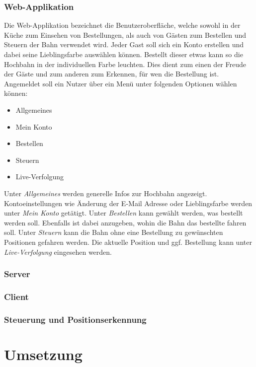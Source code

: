 \subsection{Web-Applikation}
Die Web-Applikation bezeichnet die Benutzeroberfläche, welche sowohl in der Küche zum Einsehen von Bestellungen, als auch von Gästen zum Bestellen und Steuern der Bahn verwendet wird. Jeder Gast soll sich ein Konto erstellen und dabei seine Lieblingsfarbe auswählen können.
Bestellt dieser etwas kann so die Hochbahn in der individuellen Farbe leuchten. Dies dient zum einen der Freude der Gäste und zum anderen zum Erkennen, für wen die Bestellung ist. Angemeldet soll ein Nutzer über ein Menü unter folgenden Optionen
wählen können:
\begin{itemize}
	\item Allgemeines
	\item Mein Konto
	\item Bestellen
	\item Steuern
	\item Live-Verfolgung
\end{itemize}
Unter \textit{Allgemeines} werden generelle Infos zur Hochbahn angezeigt. Kontoeinstellungen wie Änderung der E-Mail Adresse oder Lieblingsfarbe werden unter \textit{Mein Konto} getätigt. Unter \textit{Bestellen} kann gewählt werden, was bestellt werden soll.
Ebenfalls ist dabei anzugeben, wohin die Bahn das bestellte fahren soll. Unter \textit{Steuern} kann die Bahn ohne eine Bestellung zu gewünschten Positionen gefahren werden. Die aktuelle Position und ggf. Bestellung kann unter \textit{Live-Verfolgung} eingesehen werden.
\subsection{Server}
\subsection{Client}
\subsection{Steuerung und Positionserkennung}

\chapter{Umsetzung}

\lipsum